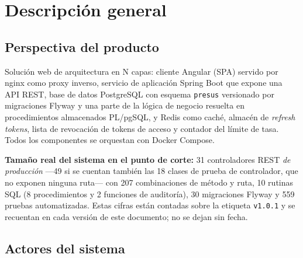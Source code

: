\documentclass[11pt,a4paper]{article}
\begin{document}
\section{Descripción general}

\subsection{Perspectiva del producto}
Solución web de arquitectura en N capas: cliente Angular (SPA) servido por nginx como proxy
inverso, servicio de aplicación Spring Boot que expone una API REST, base de datos PostgreSQL
con esquema \texttt{presus} versionado por migraciones Flyway y una parte de la lógica de
negocio resuelta en procedimientos almacenados PL/pgSQL, y Redis como caché, almacén de
\emph{refresh tokens}, lista de revocación de tokens de acceso y contador del límite de tasa.
Todos los componentes se orquestan con Docker Compose.

\textbf{Tamaño real del sistema en el punto de corte:} 31 controladores REST \emph{de
producción} ---49 si se cuentan también las 18 clases de prueba de controlador, que no exponen
ninguna ruta--- con 207 combinaciones de método y ruta, 10 rutinas SQL (8 procedimientos y 2 funciones de auditoría), 30 migraciones
Flyway y 559 pruebas automatizadas. Estas cifras están contadas sobre la etiqueta
\texttt{v1.0.1} y se recuentan en cada versión de este documento; no se dejan sin fecha.

\subsection{Actores del sistema}
\label{sec:actores}
\end{document}
